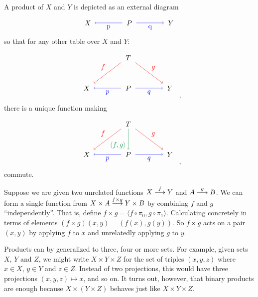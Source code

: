 A product of $X$ and $Y$ is depicted as an external diagram
	\[
	\begin{tikzpicture}
	\matrix (m) [row sep=3em,column sep=4em,minimum width=2em]
	{
		\node (A) {$X$}; & \node (P) {$P$}; & \node (B) {$Y$};\\
	};
	\draw[->, blue] (P.west) -- node[anchor=north] {p} (A.east);
	\draw[->, blue] (P.east) -- node[anchor=north] {q} (B.west);
	\end{tikzpicture}
	\]
so that for any other table over $X$ and $Y$:
	\[
	\begin{tikzpicture}
	\matrix (m) [row sep=3em,column sep=4em,minimum width=2em]
	{
		&\node (C) {$T$};\\
		\node (A) {$X$}; & \node (P) {$P$}; & \node (B) {$Y$};\\
	};
	\draw[->,red] (C.south west) -- node[anchor=south east] {$f$} (A.north east);
	\draw[->,red] (C.south east) -- node[anchor=south west] {$g$} (B.north west);
	\draw[->,blue] (P.west) -- node[anchor=north] {$p$} (A.east);
	\draw[->,blue] (P.east) -- node[anchor=north] {$q$} (B.west);
	\end{tikzpicture},
	\]
there is a unique function making 
	\[
	\begin{tikzpicture}
	\matrix (m) [row sep=3em,column sep=4em,minimum width=2em]
	{
		&\node (C) {$T$};\\
		\node (A) {$X$}; & \node (P) {$P$}; & \node (B) {$Y$};\\
	};
	\draw[->,ForestGreen] (C.south) -- node[anchor=north east] {$\langle f,g\rangle$} (P.north);
	\draw[->,red] (C.south west) -- node[anchor=south east] {$f$} (A.north east);
	\draw[->,red] (C.south east) -- node[anchor=south west] {$g$} (B.north west);
	\draw[->,blue] (P.west) -- node[anchor=north] {$p$} (A.east);
	\draw[->,blue] (P.east) -- node[anchor=north] {$q$} (B.west);
	\end{tikzpicture},
	\]
commute.		

Suppose we are given two unrelated functions $\sfromto fXY$ and $\sfromto gAB$. 
We can form a single function from $\sfromto{f\times g}{X\times A}{Y\times B}$ by combining $f$ and $g$ ``independently''. 
That is, define $f\times g = \langle f\circ \pi_0,g\circ \pi_1\rangle$.
Calculating concretely in terms of elements $(f\times g)(x,y) = (f(x),g(y))$. 
So $f\times g$ acts on a pair $(x,y)$ by applying $f$ to $x$ and unrelatedly applying $g$ to $y$.

Products can by generalized to three, four or more sets.
For example, given sets $X$, $Y$ and $Z$, we might write $X\times Y\times Z$ for the set of triples $(x,y,z)$ where $x\in X$, $y\in Y$ and $z\in Z$. 
Instead of two projections, this would have three projections $(x,y,z)\mapsto x$, and so on. 
It turns out, however, that binary products are enough because $X\times (Y\times Z)$ behaves just like $X\times Y\times Z$.

